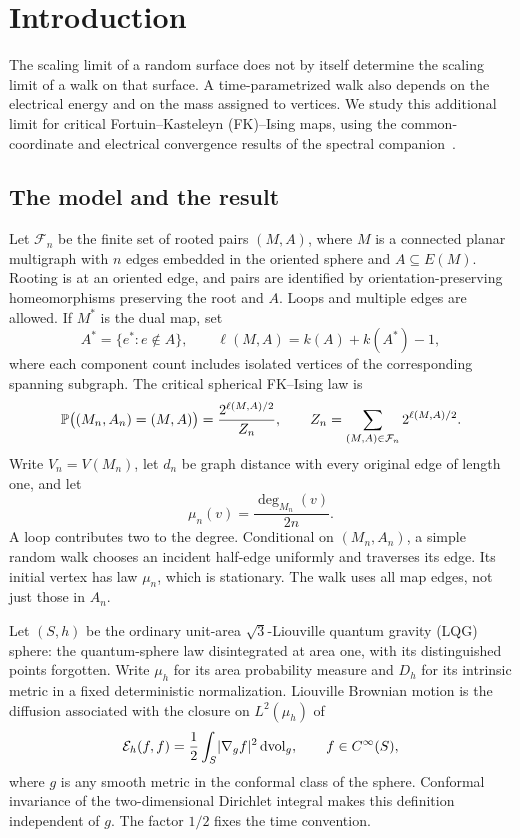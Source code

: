 \section{Introduction}\label{sec:introduction}

The scaling limit of a random surface does not by itself determine the
scaling limit of a walk on that surface. A time-parametrized walk also
depends on the electrical energy and on the mass assigned to vertices.
We study this additional limit for critical Fortuin--Kasteleyn (FK)--Ising
maps, using the common-coordinate and electrical convergence results of
the spectral companion~\cite{SC}.

\subsection{The model and the result}

Let $\mathcal F_n$ be the finite set of rooted pairs $(M,A)$, where $M$
is a connected planar multigraph with $n$ edges embedded in the oriented
sphere and $A\subseteq E(M)$. Rooting is at an oriented edge, and pairs
are identified by orientation-preserving homeomorphisms preserving the
root and $A$. Loops and multiple edges are allowed. If $M^*$ is the dual
map, set
\[
 A^*=\{e^*:e\notin A\},\qquad
 \ell(M,A)=k(A)+k(A^*)-1,
\]
where each component count includes isolated vertices of the corresponding
spanning subgraph. The critical spherical FK--Ising law is
\begin{equation}\label{eq:fk-law}
 \mathbb P\bigl((M_n,A_n)=(M,A)\bigr)
 =\frac{2^{\ell(M,A)/2}}{Z_n},\qquad
 Z_n=\sum_{(M,A)\in\mathcal F_n}2^{\ell(M,A)/2}.
\end{equation}
Write $V_n=V(M_n)$, let $d_n$ be graph distance with every original edge
of length one, and let
\begin{equation}\label{eq:corner-measure}
 \mu_n(v)=\frac{\deg_{M_n}(v)}{2n}.
\end{equation}
A loop contributes two to the degree. Conditional on $(M_n,A_n)$, a
simple random walk chooses an incident half-edge uniformly and traverses
its edge. Its initial vertex has law $\mu_n$, which is stationary.
The walk uses all map edges, not just those in $A_n$.

Let $(S,h)$ be the ordinary unit-area $\sqrt3$-Liouville quantum gravity
(LQG) sphere: the quantum-sphere law disintegrated at area one, with its
distinguished points forgotten. Write $\mu_h$ for its area probability
measure and $D_h$ for its intrinsic metric in a fixed deterministic
normalization. Liouville Brownian motion is the diffusion associated with
the closure on $L^2(\mu_h)$ of
\begin{equation}\label{eq:continuum-form}
 \mathcal E_h(f,f)=\frac12\int_S \lvert\nabla_g f\rvert^2\,\mathrm d\mathrm{vol}_g,
 \qquad f\in C^\infty(S),
\end{equation}
where $g$ is any smooth metric in the conformal class of the sphere.
Conformal invariance of the two-dimensional Dirichlet integral makes
this definition independent of $g$. The factor $1/2$ fixes the time
convention.

